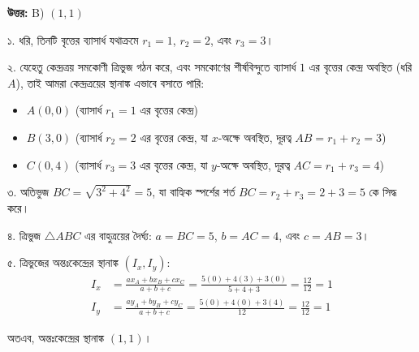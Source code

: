 \documentclass[12pt, a4paper]{article}
\begin{document}
\vspace{0.5em}
\begin{tcolorbox}[answerbox]
    \textbf{\color{success} উত্তর:} B) $(1, 1)$
\end{tcolorbox}
\vspace{1em}

\begin{tcolorbox}[solutionbox={সমাধান (Solution)}]
    \noindent
    ১. ধরি, তিনটি বৃত্তের ব্যাসার্ধ যথাক্রমে $r_1 = 1$, $r_2 = 2$, এবং $r_3 = 3$। 
    
    ২. যেহেতু কেন্দ্রত্রয় সমকোণী ত্রিভুজ গঠন করে, এবং সমকোণের শীর্ষবিন্দুতে ব্যাসার্ধ $1$ এর বৃত্তের কেন্দ্র অবস্থিত (ধরি $A$), তাই আমরা কেন্দ্রত্রয়ের স্থানাঙ্ক এভাবে বসাতে পারি:
    \begin{itemize}
        \item $A(0, 0)$ (ব্যাসার্ধ $r_1 = 1$ এর বৃত্তের কেন্দ্র)
        \item $B(3, 0)$ (ব্যাসার্ধ $r_2 = 2$ এর বৃত্তের কেন্দ্র, যা $x$-অক্ষে অবস্থিত, দূরত্ব $AB = r_1 + r_2 = 3$)
        \item $C(0, 4)$ (ব্যাসার্ধ $r_3 = 3$ এর বৃত্তের কেন্দ্র, যা $y$-অক্ষে অবস্থিত, দূরত্ব $AC = r_1 + r_3 = 4$)
    \end{itemize}
    
    ৩. অতিভুজ $BC = \sqrt{3^2 + 4^2} = 5$, যা বাহ্যিক স্পর্শের শর্ত $BC = r_2 + r_3 = 2 + 3 = 5$ কে সিদ্ধ করে। 
    
    ৪. ত্রিভুজ $\triangle ABC$ এর বাহুত্রয়ের দৈর্ঘ্য: $a = BC = 5$, $b = AC = 4$, এবং $c = AB = 3$। 
    
    ৫. ত্রিভুজের অন্তঃকেন্দ্রের স্থানাঙ্ক $(I_x, I_y)$:
    \begin{align*}
        I_x &= \frac{ax_A + bx_B + cx_C}{a+b+c} = \frac{5(0) + 4(3) + 3(0)}{5+4+3} = \frac{12}{12} = 1 \\
        I_y &= \frac{ay_A + by_B + cy_C}{a+b+c} = \frac{5(0) + 4(0) + 3(4)}{12} = \frac{12}{12} = 1
    \end{align*}
    
    অতএব, অন্তঃকেন্দ্রের স্থানাঙ্ক \textbf{$(1, 1)$}।
\end{tcolorbox}

\vspace{2em}
\end{document}
